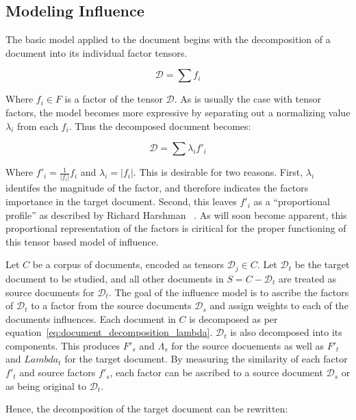 \documentclass[../dissertation.tex]{subfiles}
\begin{document}
\subsection{Modeling Influence}
The basic model applied to the document begins with the decomposition
of a document into its individual factor tensors.

\begin{equation} \label{eq:document_decomposition}
  \mathcal{D} = \sum f_i 
\end{equation}

Where $f_i\in F$ is a factor of the tensor $\mathcal{D}$.  As is usually
the case with tensor factors, the model becomes more expressive by
separating out a normalizing value $\lambda_i$ from each $f_i$.  Thus
the decomposed document becomes:

\begin{equation} \label{eq:document_decomposition_normal}
  \mathcal{D} = \sum \lambda_i f'_i
\end{equation}

Where $f'_i=\frac{1}{|f_i|} f_i$ and $\lambda_i = |f_i|$.  This is
desirable for two reasons.  First, $\lambda_i$ identifes the magnitude
of the factor, and therefore indicates the factors importance in the
target document.  Second, this leaves $f'_i$ as a ``proportional
profile'' as described by Richard Harshman~\cite{harshman1970} . As
will soon become apparent, this proportional representation of the
factors is ciritical for the proper functioning of this tensor based
model of influence.

Let $C$ be a corpus of documents, encoded as tensors $\mathcal{D}_j
\in C$.  Let $\mathcal{D}_t$ be the target document to be studied, and
all other documents in $S=C - \mathcal{D}_t$ are treated as source
documents for $\mathcal{D}_t$.  The goal of the influence model is to
ascribe the factors of $\mathcal{D}_t$ to a factor from the source
documents $\mathcal{D}_s$ and assign weights to each of the documents
influences. Each document in $C$ is decomposed as per
equation~\ref{eq:document_decomposition_lambda}.  $\mathcal{D}_t$ is
also decomposed into its components.  This produces $F'_s$ and
$\Lambda_s$ for the source docuements as well as $F'_t$ and $Lambda_t$
for the target document.  By measuring the similarity of each factor
$f'_t$ and source factors $f'_s$, each factor can be ascribed to a
source document $\mathcal{D}_s$ or as being original to
$\mathcal{D}_t$.

Hence, the decomposition of the target document can be rewritten:
\end{document}
